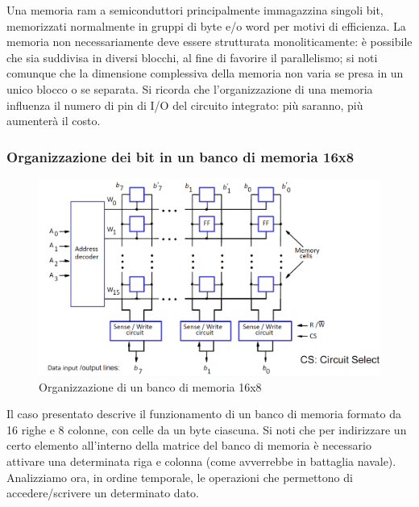 \documentclass[class=book, crop=false, oneside]{standalone}
\begin{document}
Una memoria \acrshort{ram} a semiconduttori principalmente immagazzina singoli bit, memorizzati normalmente in gruppi di byte e/o word per motivi di efficienza. La memoria non necessariamente deve essere strutturata monoliticamente: è possibile che sia suddivisa in diversi blocchi, al fine di favorire il parallelismo; si noti comunque che la dimensione complessiva della memoria non varia se presa in un unico blocco o se separata. Si ricorda che l'organizzazione di una memoria influenza il numero di pin di I/O del circuito integrato: più saranno, più aumenterà il costo.

\subsubsection{Organizzazione dei bit in un banco di memoria 16x8}
\begin{figure}[H]
	\centering
	\includegraphics[width=\textwidth,keepaspectratio]{organizzazione.png}
	\caption{Organizzazione di un banco di memoria 16x8}
\end{figure}
Il caso presentato descrive il funzionamento di un banco di memoria formato da 16 righe e 8 colonne, con celle da un byte ciascuna. Si noti che per indirizzare un certo elemento all'interno della matrice del banco di memoria è necessario attivare una determinata riga e colonna (come avverrebbe in battaglia navale). Analizziamo ora, in ordine temporale, le operazioni che permettono di accedere/scrivere un determinato dato.
\end{document}
